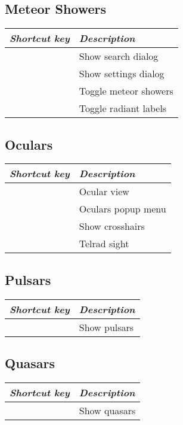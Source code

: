\subsection{Meteor Showers}
\label{ch:Hotkeys:Plugins:MeteorShowers}
\begin{longtabu}to \textwidth {rl} 
\toprule
\emph{Shortcut key}		& \emph{Description}\\\midrule
{}		& Show search dialog \\
	& Show settings dialog \\
		& Toggle meteor showers \\
			& Toggle radiant labels \\
\bottomrule
\end{longtabu}

\subsection{Oculars}
\label{ch:Hotkeys:Plugins:Oculars}
\begin{longtabu}to \textwidth {rl} 
\toprule
\emph{Shortcut key}	& \emph{Description}\\\midrule
{}		& Ocular view \\
			& Oculars popup menu \\
			& Show crosshairs \\
		& Telrad sight \\
\bottomrule
\end{longtabu}

\subsection{Pulsars}
\label{ch:Hotkeys:Plugins:Pulsars}
\begin{longtabu}to \textwidth {rl} 
\toprule
\emph{Shortcut key}	& \emph{Description}\\\midrule
{}	& Show pulsars \\
\bottomrule
\end{longtabu}

\subsection{Quasars}
\label{ch:Hotkeys:Plugins:Quasars}
\begin{longtabu}to \textwidth {rl} 
\toprule
\emph{Shortcut key}	& \emph{Description}\\\midrule
{}	& Show quasars \\
\bottomrule
\end{longtabu}

